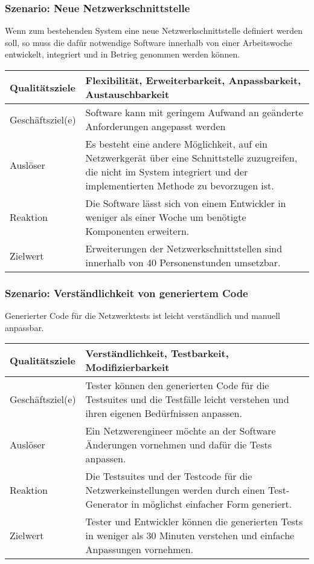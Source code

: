 \documentclass[
	ngerman,
	toc=listof, %
	toc=bibliography, %
	footnotes=multiple, %
	parskip=half, %
	numbers=noendperiod %
]{scrartcl}
\begin{document}
		\subsubsection{Szenario: Neue Netzwerkschnittstelle}
			Wenn zum bestehenden System eine neue Netzwerkschnittstelle definiert werden soll, so muss die dafür notwendige Software innerhalb von einer Arbeitswoche entwickelt, integriert und in Betrieg genommen werden können.

			\begin{tabularx}{\textwidth}{lX}
				\toprule
				Qualitätsziele & Flexibilität, Erweiterbarkeit, Anpassbarkeit, Austauschbarkeit  \\
				\midrule
				Geschäftsziel(e) & Software kann mit geringem Aufwand an geänderte Anforderungen angepasst werden  \\
				\midrule
				Auslöser & Es besteht eine andere Möglichkeit, auf ein Netzwerkgerät über eine Schnittstelle zuzugreifen, die nicht im System integriert und der implementierten Methode zu bevorzugen ist.  \\
				\midrule
				Reaktion & Die Software lässt sich von einem Entwickler in weniger als einer Woche um benötigte Komponenten erweitern.  \\
				\midrule
				Zielwert & 	Erweiterungen der Netzwerkschnittstellen sind innerhalb von 40 Personenstunden umsetzbar.  \\
				\bottomrule
			\end{tabularx}

		\subsubsection{Szenario: Verständlichkeit von generiertem Code}
			Generierter Code für die Netzwerktests ist leicht verständlich und manuell anpassbar.

			\begin{tabularx}{\textwidth}{lX}
				\toprule
				Qualitätsziele & Verständlichkeit, Testbarkeit, Modifizierbarkeit  \\
				\midrule
				Geschäftsziel(e) &  Tester können den generierten Code für die Testsuites und die Testfälle leicht verstehen und ihren eigenen Bedürfnissen anpassen. \\
				\midrule
				Auslöser & Ein Netzwerengineer möchte an der Software Änderungen vornehmen und dafür die Tests anpassen.  \\
				\midrule
				Reaktion & Die Testsuites und der Testcode für die Netzwerkeinstellungen werden durch einen Test-Generator in möglichst einfacher Form generiert. \\
				\midrule
				Zielwert & Tester und Entwickler können die generierten Tests in weniger als 30 Minuten verstehen und einfache Anpassungen vornehmen. \\
				\bottomrule
			\end{tabularx}
\end{document}
